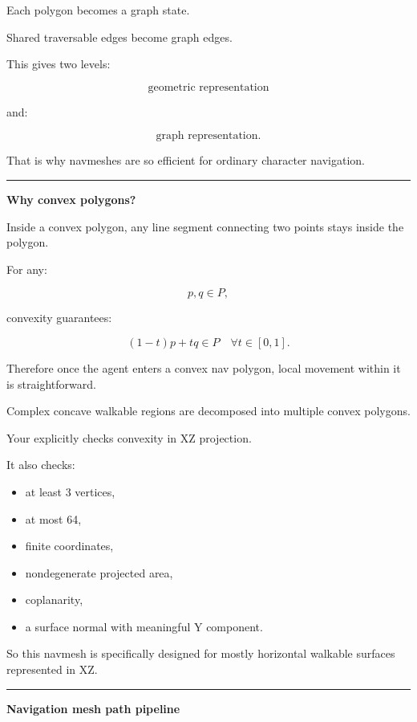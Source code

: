 Each polygon becomes a graph state.

Shared traversable edges become graph edges.

This gives two levels:

\[
\text{geometric representation}
\]

and:

\[
\text{graph representation}.
\]

That is why navmeshes are so efficient for ordinary character navigation.

\begin{center}\rule{0.5\linewidth}{0.5pt}\end{center}

\textbf{Why convex polygons?}

Inside a convex polygon, any line segment connecting two points stays inside the polygon.

For any:

\[
p,q\in P,
\]

convexity guarantees:

\[
(1-t)p+tq\in P
\quad
\forall t\in[0,1].
\]

Therefore once the agent enters a convex nav polygon, local movement within it is straightforward.

Complex concave walkable regions are decomposed into multiple convex polygons.

Your  explicitly checks convexity in XZ projection.

It also checks:

\begin{itemize}
\tightlist
\item
  at least 3 vertices,
\item
  at most 64,
\item
  finite coordinates,
\item
  nondegenerate projected area,
\item
  coplanarity,
\item
  a surface normal with meaningful Y component.
\end{itemize}

So this navmesh is specifically designed for mostly horizontal walkable surfaces represented in XZ.

\begin{center}\rule{0.5\linewidth}{0.5pt}\end{center}

\textbf{Navigation mesh path pipeline}

